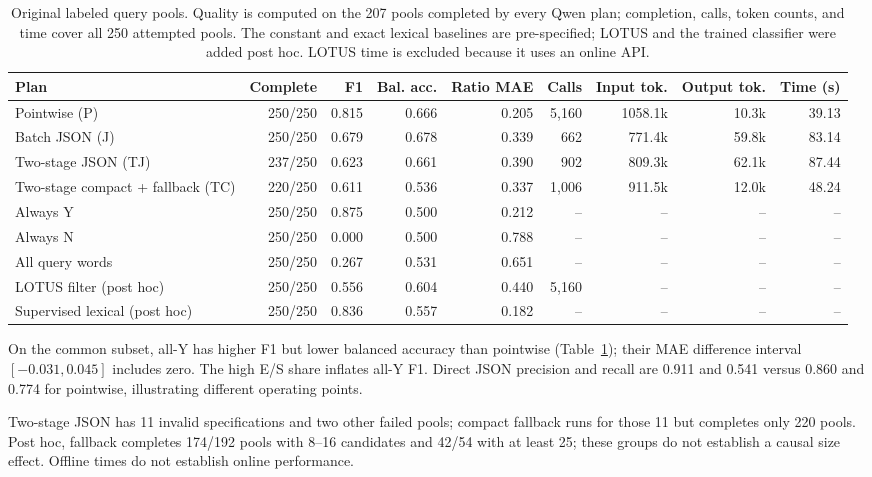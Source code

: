 \documentclass[conference]{IEEEtran}
\begin{document}
\begin{table}[t]
\caption{Original labeled query pools. Quality is computed on the 207 pools completed by every Qwen plan; completion, calls, token counts, and time cover all 250 attempted pools. The constant and exact lexical baselines are pre-specified; LOTUS and the trained classifier were added post hoc. LOTUS time is excluded because it uses an online API.}
\label{tab:full}
\centering\small
\begin{tabular}{lrrrrrrrr}
\toprule
Plan & Complete & F1 & Bal. acc. & Ratio MAE & Calls & Input tok. & Output tok. & Time (s) \\
\midrule
Pointwise (P) & 250/250 & 0.815 & 0.666 & 0.205 & 5,160 & 1058.1k & 10.3k & 39.13 \\
Batch JSON (J) & 250/250 & 0.679 & 0.678 & 0.339 & 662 & 771.4k & 59.8k & 83.14 \\
Two-stage JSON (TJ) & 237/250 & 0.623 & 0.661 & 0.390 & 902 & 809.3k & 62.1k & 87.44 \\
Two-stage compact + fallback (TC) & 220/250 & 0.611 & 0.536 & 0.337 & 1,006 & 911.5k & 12.0k & 48.24 \\
Always Y & 250/250 & 0.875 & 0.500 & 0.212 & -- & -- & -- & -- \\
Always N & 250/250 & 0.000 & 0.500 & 0.788 & -- & -- & -- & -- \\
All query words & 250/250 & 0.267 & 0.531 & 0.651 & -- & -- & -- & -- \\
LOTUS filter (post hoc) & 250/250 & 0.556 & 0.604 & 0.440 & 5,160 & -- & -- & -- \\
Supervised lexical (post hoc) & 250/250 & 0.836 & 0.557 & 0.182 & -- & -- & -- & -- \\
\bottomrule
\end{tabular}
\end{table}

On the common subset, all-Y has higher F1 but lower balanced accuracy than pointwise (Table~\ref{tab:full}); their MAE difference interval $[-0.031,0.045]$ includes zero. The high E/S share inflates all-Y F1. Direct JSON precision and recall are 0.911 and 0.541 versus 0.860 and 0.774 for pointwise, illustrating different operating points.

Two-stage JSON has 11 invalid specifications and two other failed pools; compact fallback runs for those 11 but completes only 220 pools. Post hoc, fallback completes 174/192 pools with 8--16 candidates and 42/54 with at least 25; these groups do not establish a causal size effect. Offline times do not establish online performance.
\end{document}
